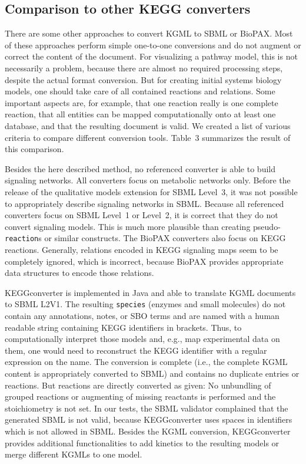 \documentclass[10pt]{bmc_article}
\newenvironment{bmcformat}{\baselineskip20pt\sloppy\setboolean{publ}{false}}{\baselineskip20pt\sloppy}
\newcommand{\reactions}{\texttt{re\-ac\-tion}s}
\newcommand{\species}{\texttt{species}}
\begin{document}
\begin{bmcformat}
\subsection*{Comparison to other KEGG converters}

There are some other approaches to convert KGML to SBML or BioPAX. Most of these approaches perform simple one-to-one conversions and do not augment or correct the content of the document. For visualizing a pathway model, this is not necessarily a problem, because there are almost no required processing steps, despite the actual format conversion. But for creating initial systems biology models, one should take care of all contained reactions and relations. Some important aspects are, for example, that one reaction really is one complete reaction, that all entities can be mapped computationally onto at least one database, and that the resulting document is valid. We created a list of various criteria to compare different conversion tools. Table~3 summarizes the result of this comparison.

Besides the here described method, no referenced converter is able to build signaling networks. All converters focus on metabolic networks only. Before the release of the qualitative models extension for SBML Level~3, it was not possible to appropriately describe signaling networks in SBML. Because all referenced converters focus on SBML Level~1 or Level~2, it is correct that they do not convert signaling models. This is much more plausible than creating pseudo-\reactions{} or similar constructs. The BioPAX converters also focus on KEGG reactions. Generally, relations encoded in KEGG signaling maps seem to be completely ignored, which is incorrect, because BioPAX provides appropriate data structures to encode those relations.

KEGGconverter \cite{KEGGconverter} is implemented in Java\texttrademark{} and able to translate KGML documents to SBML L2V1. The resulting \species{} (enzymes and small molecules) do not contain any annotations, notes, or SBO terms and are named with a human readable string containing KEGG identifiers in brackets. Thus, to computationally interpret those models and, e.g., map experimental data on them, one would need to reconstruct the KEGG identifier with a regular expression on the name. The conversion is complete (i.e., the complete KGML content is appropriately converted to SBML) and contains no duplicate entries or reactions. But reactions are directly converted as given: No unbundling of grouped reactions or augmenting of missing reactants is performed and the stoichiometry is not set. In our tests, the SBML validator complained that the generated SBML is not valid, because KEGGconverter uses spaces in identifiers which is not allowed in SBML. Besides the KGML conversion, KEGGconverter provides additional functionalities to add kinetics to the resulting models or merge different KGMLs to one model.


\end{bmcformat}
\end{document}
